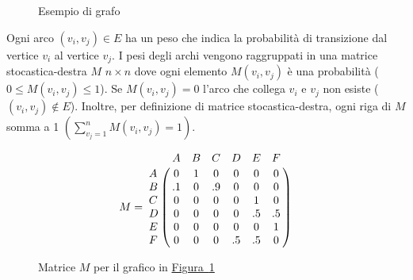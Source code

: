 {\begin{figure}[!h]
        \caption[]{Esempio di grafo}\label{fig:graph}
    \end{figure}

    Ogni arco $(v_i,v_j)\in E$ ha un peso che indica la probabilità di transizione dal vertice $v_i$ 
    al vertice $v_j$. I pesi degli archi vengono raggruppati in una matrice stocastica-destra $M$ $n\times n$ 
    dove ogni elemento $M(v_i,v_j)$ è una probabilità ($0\le M(v_i,v_j)\le 1$). Se $M(v_i,v_j)=0$ l'arco che collega 
    $v_i$ e $v_j$ non esiste ($(v_i,v_j)\not \in E$). Inoltre, per definizione di matrice stocastica-destra,
    ogni riga di $M$ somma a 1 $(\sum_{v_j=1}^n{M(v_i,v_j)}=1)$.

    \begin{figure}[!h]\label{matrix_graph}
        \[ M =\bordermatrix{ & A & B & C & D & E & F \cr 
                            A &0 &1 &0 &0 &0 &0 \cr
                            B &.1 &0 &.9 &0 &0 &0 \cr
                            C &0 &0 &0 &0 &1 &0  \cr
                            D &0 &0 &0 &0 &.5 &.5 \cr
                            E &0 &0 &0 &0 &0 &1 \cr
                            F &0 &0 &0 &.5 &.5 &0\cr
                            }\]
        \caption{Matrice $M$ per il grafico in \hyperref[fig:graph]{Figura\ \ref{fig:graph}}}
    \end{figure}
    }

